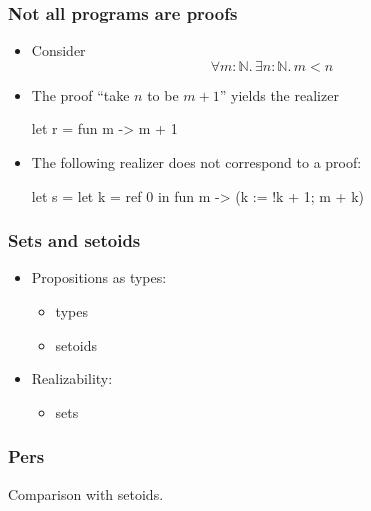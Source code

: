 \documentclass[t]{beamer}
\newcommand{\NN}{\mathbb{N}}
\begin{document}
\begin{frame}[fragile]
  \frametitle{Not all programs are proofs}

  \begin{itemize}
  \item Consider
    \begin{equation*}
      \forall m : \NN .\, \exists n : \NN .\, m < n
    \end{equation*}
  \item The proof ``take $n$ to be $m+1$'' yields the realizer
\begin{source}
  let r = fun m -> m + 1      
\end{source}
  \item The following realizer does not correspond to a proof:
\begin{source}
  let s =
    let k = ref 0 in
      fun m -> (k := !k + 1; m + k)
\end{source}
    \end{itemize}
\end{frame}

\begin{frame}
  \frametitle{Sets and setoids}

  \begin{itemize}
  \item Propositions as types:
    \begin{itemize}
    \item types
    \item setoids
    \end{itemize}
  \item Realizability:
    \begin{itemize}
    \item sets
    \end{itemize}
  \end{itemize}

\end{frame}

\begin{frame}
  \frametitle{Pers}

  Comparison with setoids.

\end{frame}
\end{document}
